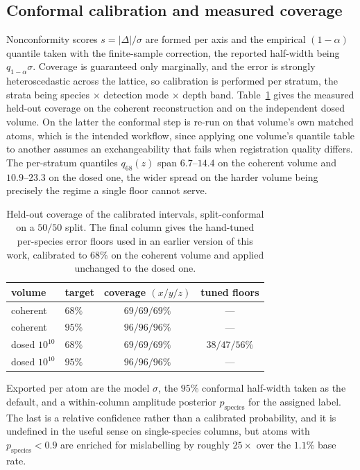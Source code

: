 \documentclass[aps,prb,twocolumn,superscriptaddress,floatfix,nofootinbib]{revtex4-2}
\begin{document}
\subsection{Conformal calibration and measured coverage}

Nonconformity scores $s=|\Delta|/\sigma$ are formed per axis and the empirical $(1-\alpha)$
quantile taken with the finite-sample correction, the reported half-width being
$q_{1-\alpha}\sigma$. Coverage is guaranteed only marginally, and the error is strongly
heteroscedastic across the lattice, so calibration is performed per stratum, the strata being
species $\times$ detection mode $\times$ depth band. Table~\ref{tab:cov} gives the measured
held-out coverage on the coherent reconstruction and on the independent dosed volume. On the
latter the conformal step is re-run on that volume's own matched atoms, which is the intended
workflow, since applying one volume's quantile table to another assumes an exchangeability that
fails when registration quality differs. The per-stratum quantiles $q_{68}(z)$ span
$6.7$--$14.4$ on the coherent volume and $10.9$--$23.3$ on the dosed one, the wider spread on
the harder volume being precisely the regime a single floor cannot serve.

\begin{table}[t]
  \centering \small
  \begin{tabular}{@{}llcc@{}}
    \toprule
    volume & target & coverage $(x/y/z)$ & tuned floors \\
    \midrule
    coherent  & $68\%$ & $69/69/69\%$ & --- \\
    coherent  & $95\%$ & $96/96/96\%$ & --- \\
    dosed $10^{10}$ & $68\%$ & $69/69/69\%$ & $38/47/56\%$ \\
    dosed $10^{10}$ & $95\%$ & $96/96/96\%$ & --- \\
    \bottomrule
  \end{tabular}
  \caption{Held-out coverage of the calibrated intervals, split-conformal on a $50/50$ split.
    The final column gives the hand-tuned per-species error floors used in an earlier version of
    this work, calibrated to $68\%$ on the coherent volume and applied unchanged to the dosed
    one.}
  \label{tab:cov}
\end{table}

Exported per atom are the model $\sigma$, the $95\%$ conformal half-width taken as the default,
and a within-column amplitude posterior $p_{\mathrm{species}}$ for the assigned label. The last
is a relative confidence rather than a calibrated probability, and it is undefined in the useful
sense on single-species columns, but atoms with $p_{\mathrm{species}}<0.9$ are enriched for
mislabelling by roughly $25\times$ over the $1.1\%$ base rate.
\end{document}
